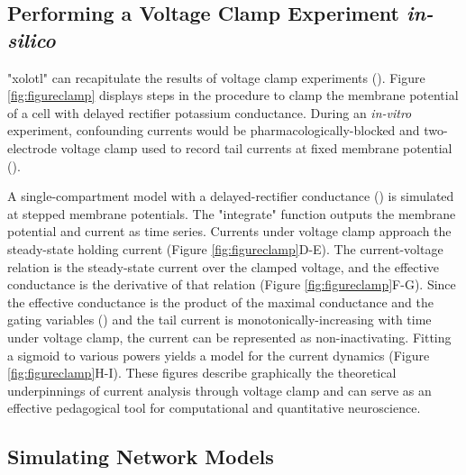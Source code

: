 \documentclass{frontiersSCNS} %
\begin{document}
%
%
%
%
%
%

\subsection{Performing a Voltage Clamp Experiment \textit{in-silico}}

"xolotl" can recapitulate the results of voltage clamp experiments (\cite{turrigianoSelectiveRegulationCurrent1995, swensenMultiplePeptidesConverge2000, swensenModulatorsConvergentCellular2001, destexheDynamicClampPrinciplesApplications2009}). Figure \ref{fig:figureclamp} displays steps in the procedure to clamp the membrane potential of a cell with delayed rectifier potassium conductance. During an \textit{in-vitro} experiment, confounding currents would be pharmacologically-blocked and two-electrode voltage clamp used to record tail currents at fixed membrane potential (\cite{connorInwardDelayedOutward1971, connorVoltageClampStudies1971}).

A single-compartment model with a delayed-rectifier conductance (\cite{liuModelNeuronActivitydependent1998}) is simulated at stepped membrane potentials. The "integrate" function outputs the membrane potential and current as time series. Currents under voltage clamp approach the steady-state holding current (Figure \ref{fig:figureclamp}D-E). The current-voltage relation is the steady-state current over the clamped voltage, and the effective conductance is the derivative of that relation (Figure \ref{fig:figureclamp}F-G). Since the effective conductance is the product of the maximal conductance and the gating variables (\cite{dayanTheoreticalNeuroscience2001, turrigianoSelectiveRegulationCurrent1995}) and the tail current is monotonically-increasing with time under voltage clamp, the current can be represented as non-inactivating. Fitting a sigmoid to various powers yields a model for the current dynamics (Figure \ref{fig:figureclamp}H-I). These figures describe graphically the theoretical underpinnings of current analysis through voltage clamp and can serve as an effective pedagogical tool for computational and quantitative neuroscience.

%
%
%
%
%
%

\subsection{Simulating Network Models}
\end{document}
